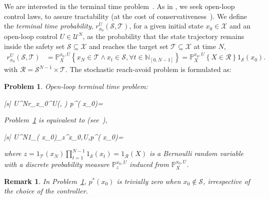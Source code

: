\documentclass[11pt,letterpaper]{article}
\newtheorem{remark}{Remark}
\newtheorem{problem}{Problem}
\newcommand{\U}{\mathcal{U}}
\newcommand{\X}{\mathcal{X}}
\newcommand{\mcS}{\mathcal{S}}
\newcommand{\mcT}{\mathcal{T}}
\newcommand{\mcR}{\mathcal{R}}
\newcommand{\Prob}{\mathbb{P}}
\newcommand{\Exp}{\mathbb{E}}
\newcommand{\Costpi}{r_{x_0}^{U}(\mcS, \mcT)}
\begin{document}
	
	We are interested in the terminal time problem~\cite{SummersAutomatica2010}.
 As in \cite{SummersAutomatica2010}, we seek open-loop control laws, to assure tractability (at the cost of conservativeness~\cite{VinodLCSS2017,lesser2013stochastic,VinodHSCC2018}).
	We define the \emph{terminal time probability}, $\Costpi$, for a given initial state $x_0\in \X$ and an open-loop control $U\in \U^N$, as the probability that the state trajectory remains inside the safety set $\mcS \subseteq \X$ and reaches the target set $\mcT \subseteq \X$ at time $N$,
	\begin{align} 
	\Costpi &= \Prob_{X}^{x_0,U}\left\{x_{N}\in \mcT \wedge x_t\in \mcS,\forall t\in \mathbb{N}_{[0,N-1]}\right\}= \Prob_{X}^{x_0,U}\left\{ X\in \mcR\right\} 1_{\mcS}( x_0).\label{eq:r_prob} 
	\end{align}
	with $ \mcR = \mcS^{N-1}\times \mcT $.
	The stochastic reach-avoid problem is formulated as: 
	\begin{problem} \label{prb:Original}  Open-loop terminal time problem:
		\begin{maxi} |s|
			{U\in \U^{N}}{\Costpi}{\label{prob:original}} {p^{\ast}( x_{0})=}
		\end{maxi}
		Problem~\ref{prb:Original} is equivalent to (see~\cite[Sec. 4]{SummersAutomatica2010}),
		\begin{maxi} |s|
			{U\in \U^{N}}{1_\mcS( x_0)\Exp_z^{x_0,U}\left[  z \right],}{\label{prob:original_exp}}{p^{\ast}( x_{0})=}
		\end{maxi}
\hspace{-1.5mm}where $z=1_\mcT(x_N)\prod_{t=1}^{N-1}1_\mcS(x_t) = 1_{\mcR}(X)$ is a Bernoulli random variable with a discrete probability measure $\Prob_z^{x_0,U}$ induced from $\Prob_X^{x_0,U}$.
	\end{problem}
	\begin{remark}\label{rem:zeroProb}
		In Problem~\ref{prb:Original}, $p^\ast(x_0)$ is trivially zero when $x_0\not\in\mcS$, irrespective of the choice of the controller.
	\end{remark}
\end{document}
